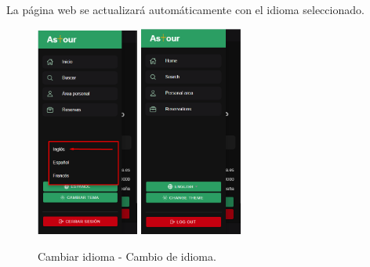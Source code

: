 \begin{enumerate}
	      La página web se actualizará automáticamente con el idioma seleccionado.
	      \begin{figure}[H]
		      \centering
		      \includegraphics[width=0.3\textwidth]{7-Construccion/Manuales/mobile/opciones idioma.png}
		      \includegraphics[width=0.3\textwidth]{7-Construccion/Manuales/mobile/ingles.png}
		      \caption{Cambiar idioma - Cambio de idioma.}
	      \end{figure}
\end{enumerate}

